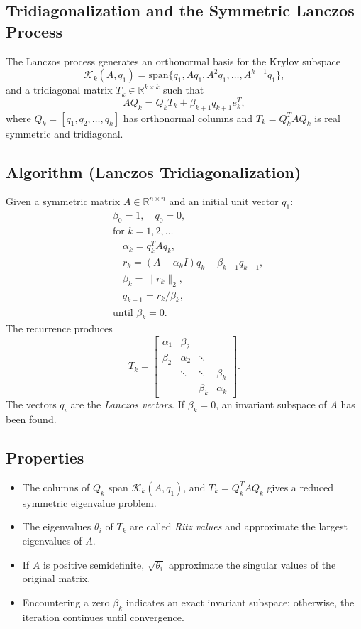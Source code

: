 \documentclass[13pt]{article}
\begin{document}
\subsection{Tridiagonalization and the Symmetric Lanczos Process}

The Lanczos process generates an orthonormal basis for the Krylov subspace
\[
\mathcal{K}_k(A, q_1) = \text{span}\{q_1, A q_1, A^2 q_1, \ldots, A^{k-1} q_1\},
\]
and a tridiagonal matrix \(T_k \in \mathbb{R}^{k \times k}\) such that
\[
A Q_k = Q_k T_k + \beta_{k+1} q_{k+1} e_k^T,
\]
where \(Q_k = [q_1, q_2, \ldots, q_k]\) has orthonormal columns and \(T_k = Q_k^T A Q_k\) is real symmetric and tridiagonal.


\subsection{Algorithm (Lanczos Tridiagonalization)}
Given a symmetric matrix \(A \in \mathbb{R}^{n \times n}\) and an initial unit vector \(q_1\):
\[
\begin{aligned}
&\beta_0 = 1, \quad q_0 = 0, \\
&\text{for } k = 1, 2, \ldots \\
&\quad \alpha_k = q_k^T A q_k, \\
&\quad r_k = (A - \alpha_k I) q_k - \beta_{k-1} q_{k-1}, \\
&\quad \beta_k = \|r_k\|_2, \\
&\quad q_{k+1} = r_k / \beta_k, \\
&\text{until } \beta_k = 0.
\end{aligned}
\]
The recurrence produces
\[
T_k =
\begin{bmatrix}
\alpha_1 & \beta_2 &        &        \\
\beta_2  & \alpha_2 & \ddots &        \\
         & \ddots & \ddots & \beta_k \\
         &        & \beta_k & \alpha_k
\end{bmatrix}.
\]
The vectors \(q_i\) are the \emph{Lanczos vectors}. If \(\beta_k = 0\), an invariant subspace of \(A\) has been found.

\subsection{Properties}
\begin{itemize}
\item The columns of \(Q_k\) span \(\mathcal{K}_k(A, q_1)\), and \(T_k = Q_k^T A Q_k\) gives a reduced symmetric eigenvalue problem.
\item The eigenvalues \(\theta_i\) of \(T_k\) are called \emph{Ritz values} and approximate the largest eigenvalues of \(A\).
\item If \(A\) is positive semidefinite, \(\sqrt{\theta_i}\) approximate the singular values of the original matrix.
\item Encountering a zero \(\beta_k\) indicates an exact invariant subspace; otherwise, the iteration continues until convergence.
\end{itemize}
\end{document}

